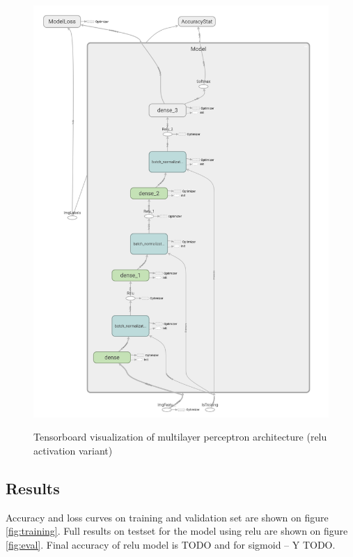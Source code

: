 \documentclass[a4paper]{article}
\begin{document}
\begin{figure}[h]
    \caption[]{Tensorboard visualization of multilayer perceptron architecture (relu activation variant)}
    \centering
    \includegraphics[page=2,width=1.0\textwidth]{architecture.png}
    \label{fig:arch}
\end{figure}

\subsection{Results}
Accuracy and loss curves on training and validation set are shown on figure \ref{fig:training}.
Full results on testset for the model using relu are shown on figure \ref{fig:eval}.
Final accuracy of relu model is TODO and for sigmoid -- Y TODO.
\end{document}
